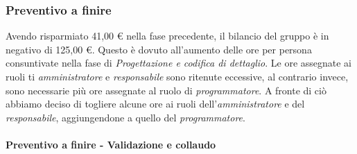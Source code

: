 \documentclass[../piano_di_progetto.tex]{subfiles}
\begin{document}
\subsubsection{Preventivo a finire}
\label{sub:cons_prev_fine_4} 
Avendo risparmiato 41,00 € nella fase precedente, il bilancio del gruppo è in negativo di  125,00 €. Questo è dovuto all'aumento delle ore per persona consuntivate nella fase di \emph{Progettazione e codifica di dettaglio}. Le ore assegnate ai ruoli ti \emph{amministratore} e \emph{responsabile} sono ritenute eccessive, al contrario invece, sono necessarie più ore assegnate al ruolo di \emph{programmatore}. A fronte di ciò abbiamo deciso di togliere alcune ore ai ruoli dell'\emph{amministratore} e del \emph{responsabile}, aggiungendone a quello del \emph{programmatore}. 

\paragraph{Preventivo a finire - Validazione e collaudo}
\end{document}

